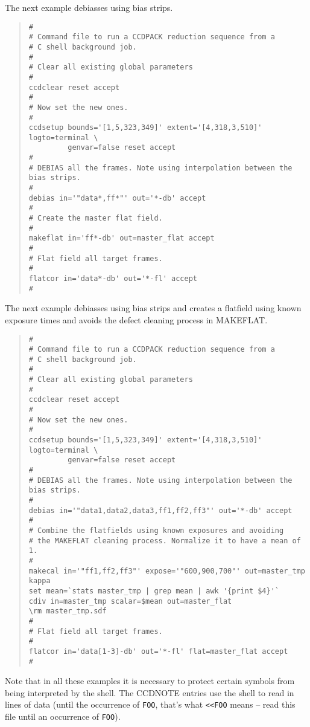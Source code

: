 \documentclass[twoside,11pt]{article}
\newcommand{\htmlref}[2]{#1}
\renewcommand{\_}{\texttt{\symbol{95}}}
\newenvironment{myquote}{\begin{quote}\begin{small}}{\end{small}\end{quote}}
\newcommand{\text}[1]{{\small \tt #1}}
\newcommand{\xroutine}[1]{\htmlref{{\sc #1}}{#1}}
\begin{document}
The next example debiasses using bias strips.

\newpage
\begin{center}
\end{center}

\begin{myquote}
\begin{verbatim}
#
# Command file to run a CCDPACK reduction sequence from a
# C shell background job.
#
# Clear all existing global parameters
#
ccdclear reset accept
#
# Now set the new ones.
#
ccdsetup bounds='[1,5,323,349]' extent='[4,318,3,510]' logto=terminal \
         genvar=false reset accept
#
# DEBIAS all the frames. Note using interpolation between the bias strips.
#
debias in='"data*,ff*"' out='*-db' accept
#
# Create the master flat field.
#
makeflat in='ff*-db' out=master_flat accept
#
# Flat field all target frames.
#
flatcor in='data*-db' out='*-fl' accept
#
\end{verbatim}
\end{myquote}

The next example debiasses using bias strips and creates a flatfield
using known exposure times and avoids the defect cleaning process in
\xroutine{MAKEFLAT}.

\begin{center}
\end{center}

\begin{myquote}
\begin{verbatim}
#
# Command file to run a CCDPACK reduction sequence from a
# C shell background job.
#
# Clear all existing global parameters
#
ccdclear reset accept
#
# Now set the new ones.
#
ccdsetup bounds='[1,5,323,349]' extent='[4,318,3,510]' logto=terminal \
         genvar=false reset accept
#
# DEBIAS all the frames. Note using interpolation between the bias strips.
#
debias in='"data1,data2,data3,ff1,ff2,ff3"' out='*-db' accept
#
# Combine the flatfields using known exposures and avoiding
# the MAKEFLAT cleaning process. Normalize it to have a mean of 1.
#
makecal in='"ff1,ff2,ff3"' expose='"600,900,700"' out=master_tmp
kappa
set mean=`stats master_tmp | grep mean | awk '{print $4}'`
cdiv in=master_tmp scalar=$mean out=master_flat
\rm master_tmp.sdf
#
# Flat field all target frames.
#
flatcor in='data[1-3]-db' out='*-fl' flat=master_flat accept
#
\end{verbatim}
\end{myquote}

Note that in all these examples it is necessary to protect certain
symbols from being interpreted by the shell. The
\xroutine{CCDNOTE} entries use the shell to read in lines of data (until the
occurrence of \text{FOO}, that's what \text{<<FOO} means -- read
this file until an occurrence of \text{FOO}).
\end{document}
